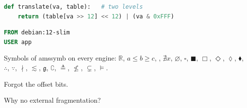 \documentclass[11pt,a4paper]{article}
\begin{document}
\begin{lstlisting}[language=Python,caption={A translation}]
def translate(va, table):   # two levels
    return (table[va >> 12] << 12) | (va & 0xFFF)
\end{lstlisting}
\begin{lstlisting}[language=Dockerfile]
FROM debian:12-slim
USER app
\end{lstlisting}
Symbols of amssymb on every engine: $\mathbb{R}$, $a \leqslant b \geqslant c$, \checkmark, $\nexists x$, $\varnothing$, $\square$, $\blacksquare$, $\Box$, $\Diamond$, $\lozenge$, $\blacklozenge$, $\therefore$, $\because$, $\nmid$, $\lesssim$, $\mathfrak{g}$, $\complement$, $\triangleq$, $\nleq$, $\subsetneq$, $\models$.
\begin{mistakes}\item Forgot the offset bits.\end{mistakes}
\begin{recall}\item Why no external fragmentation?\end{recall}
\end{document}
